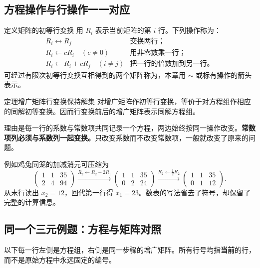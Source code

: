 \documentclass[a4paper,12pt,twoside,openany,fontset=none]{ctexbook}
\newcounter{theorem}[chapter]
\newenvironment{theorem}[1][]{\begin{thmBox}{定理}{#1}}{\end{thmBox}}
\newcounter{definition}[chapter]
\newenvironment{definition}[1][]{\begin{defBox}{定义}{#1}}{\end{defBox}}
\numberwithin{equation}{chapter}
\begin{document}
\subsection*{方程操作与行操作一一对应}

\begin{definition}[矩阵的初等行变换]
用 $R_i$ 表示当前矩阵的第 $i$ 行。下列操作称为\textbf{}：
\[
\begin{array}{ll}
 R_i\leftrightarrow R_j & \text{交换两行；}\\[3pt]
 R_i\leftarrow cR_i\quad(c\ne0) & \text{用非零数乘一行；}\\[3pt]
 R_i\leftarrow R_i+cR_j\quad(i\ne j) & \text{把一行的倍数加到另一行。}
\end{array}
\]
可经过有限次初等行变换互相得到的两个矩阵称为\textbf{}，本章用 $\sim$ 或标有操作的箭头表示。
\end{definition}

\begin{theorem}[增广矩阵行变换保持解集]
对增广矩阵作初等行变换，等价于对方程组作相应的同解初等变换。因而行变换前后的增广矩阵表示同解方程组。
\end{theorem}

理由是每一行的系数与常数项共同记录一个方程，两边始终按同一操作改变。\textbf{常数项列必须与系数列一起变换。}只改变系数而不改变常数项，一般就改变了原来的问题。

例如鸡兔同笼的加减消元可压缩为
\[
 \left(\begin{array}{rr|r}1&1&35\\2&4&94\end{array}\right)
 \xrightarrow{R_2\leftarrow R_2-2R_1}
 \left(\begin{array}{rr|r}1&1&35\\0&2&24\end{array}\right)
 \xrightarrow{R_2\leftarrow\frac12 R_2}
 \left(\begin{array}{rr|r}1&1&35\\0&1&12\end{array}\right).
\]
从末行读出 $x_2=12$，回代第一行得 $x_1=23$。数表的写法省去了符号，却保留了完整的计算信息。

\subsection*{同一个三元例题：方程与矩阵对照}

以下每一行左侧是方程组，右侧是同一步骤的增广矩阵。所有行号均指\textbf{当前}的行，而不是原始方程中永远固定的编号。
\end{document}
